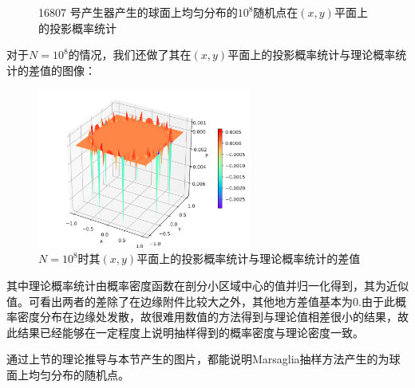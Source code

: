 \documentclass[a4paper,11pt]{article}
\begin{document}
\begin{figure}[!htbp]   
\centering     
{}
\caption{16807 号产生器产生的球面上均匀分布的$10^{8}$随机点在$(x,y)$平面上的投影概率统计}      
\end{figure}

\newpage 对于$N=10^{8}$的情况，我们还做了其在$(x,y)$平面上的投影概率统计与理论概率统计的差值的图像：

\begin{figure}[!htbp]
\centering
\includegraphics[width=7cm]{difference-8}
\caption{$N=10^{8}$时其$(x,y)$平面上的投影概率统计与理论概率统计的差值}	
\end{figure}

\newpage 其中理论概率统计由概率密度函数在剖分小区域中心的值并归一化得到，其为近似值。可看出两者的差除了在边缘附件比较大之外，其他地方差值基本为0.由于此概率密度分布在边缘处发散，故很难用数值的方法得到与理论值相差很小的结果，故此结果已经能够在一定程度上说明抽样得到的概率密度与理论密度一致。

 通过上节的理论推导与本节产生的图片，都能说明Marsaglia抽样方法产生的为球面上均匀分布的随机点。
\end{document}
